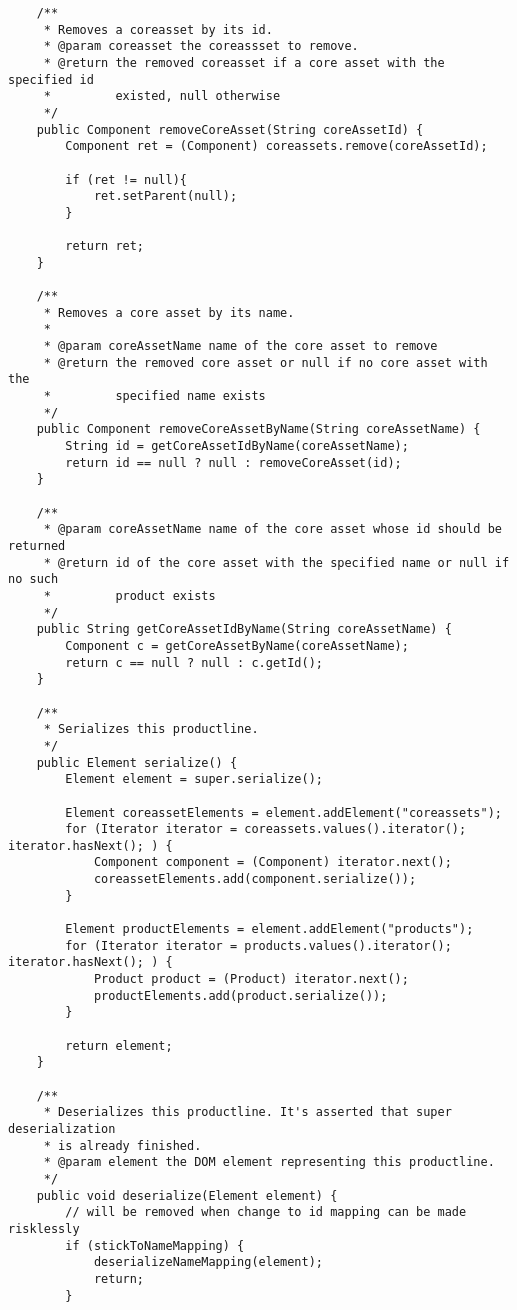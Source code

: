 \begin{verbatim}
	/**
	 * Removes a coreasset by its id.
	 * @param coreasset the coreassset to remove.
     * @return the removed coreasset if a core asset with the specified id 
     *         existed, null otherwise 
	 */
	public Component removeCoreAsset(String coreAssetId) {
		Component ret = (Component) coreassets.remove(coreAssetId);
        
        if (ret != null){
        	ret.setParent(null);
        }
        
        return ret;
	}
    
    /**
     * Removes a core asset by its name.
     * 
     * @param coreAssetName name of the core asset to remove
     * @return the removed core asset or null if no core asset with the 
     *         specified name exists
     */
    public Component removeCoreAssetByName(String coreAssetName) {
        String id = getCoreAssetIdByName(coreAssetName);
        return id == null ? null : removeCoreAsset(id);
    }

    /**
     * @param coreAssetName name of the core asset whose id should be returned
     * @return id of the core asset with the specified name or null if no such
     *         product exists
     */
    public String getCoreAssetIdByName(String coreAssetName) {
        Component c = getCoreAssetByName(coreAssetName);
        return c == null ? null : c.getId();
    }
    
	/**
	 * Serializes this productline.
	 */
	public Element serialize() {
		Element element = super.serialize();

		Element coreassetElements = element.addElement("coreassets");
		for (Iterator iterator = coreassets.values().iterator(); iterator.hasNext(); ) {
			Component component = (Component) iterator.next();
			coreassetElements.add(component.serialize());
		}
		
		Element productElements = element.addElement("products");
		for (Iterator iterator = products.values().iterator(); iterator.hasNext(); ) {
			Product product = (Product) iterator.next();
			productElements.add(product.serialize());
		}

		return element;
	}

	/**
	 * Deserializes this productline. It's asserted that super deserialization
	 * is already finished.
	 * @param element the DOM element representing this productline.
	 */
	public void deserialize(Element element) {
        // will be removed when change to id mapping can be made risklessly
        if (stickToNameMapping) {
            deserializeNameMapping(element);
            return;
        }


\end{verbatim}
